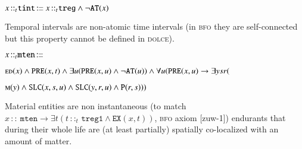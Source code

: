 \documentclass[ao]{iosart2x}
\newcommand{\dbDefLabel}{\textrm{d$_\texttt{db}$}}
\newcounter{cntdbdf}
\newcommand{\dbdf}[1]{\refstepcounter{cntdbdf}\begin{small}{\bf \dbDefLabel\thecntdbdf\label{#1}}\end{small}}
\newcommand{\pr}[1]{\mathtt{#1}}
\newcommand{\cn}[1]{\mathtt{#1}}
\newcommand\textequal{%
 \rule[.08ex]{5pt}{0.35pt}\llap{\rule[.78ex]{5pt}{0.35pt}}}
\newcommand{\sdef}{{\hspace{1.5pt}:\hspace{-2.5pt}\textequal\hspace{3pt}}}
\newcommand{\dolce}{{\textsc{dolce}}}
\newcommand{\bfo}{{\textsc{bfo}}}
\newcommand {\Mdcat} {\textsc{m}}
\newcommand {\ASdcat} {\textsc{as}}
\newcommand {\EDdcat} {\textsc{ed}}
\newcommand {\Pd} {\ensuremath{\pr{P}}}
\newcommand {\ATd} {\ensuremath{\pr{AT}}}
\newcommand {\PREd} {\ensuremath{\pr{PRE}}}
\newcommand {\SDd} {\ensuremath{\pr{SD}}}
\newcommand {\SLCd} {\ensuremath{\pr{SLC}}}
\newcommand{\mtenbcat}{\cn{mten}}
\newcommand{\tregbcat}{\cn{treg}}
\newcommand{\tintbcat}{\cn{tint}}
\newcommand{\onetregbcat}{\cn{treg1}}
\newcommand{\bfoexist}{\pr{EX}}
\newcommand{\bfoiof}[1]{{\,::_{#1\:\!}}}
\begin{document}
\item[\dbdf{d2b_tint}] $x \bfoiof{t} \tintbcat \sdef x \bfoiof{t} \tregbcat \land \neg\ATd(x)$

\vspace{1pt}
Temporal intervals are non-atomic time intervals (in {\bfo} they are self-connected but this property cannot be defined in {\dolce}).

%

\item[\dbdf{d2b_mten}] $x \bfoiof{t} \mtenbcat \sdef \ $\parbox[t]{\textwidth}{$\EDdcat(x) \land 
\PREd(x,t) \land \exists u(\PREd(x,u) \land \neg \ATd(u)) \land \\
\forall u(\PREd(x,u) \to \exists ysr($\parbox[t]{\textwidth}{$\Mdcat(y) \land \SLCd(x,s,u) \land \SLCd(y,r,u) \land \Pd(r,s)))$}}

\vspace{1pt}
Material entities are non instantaneous (to match $x \bfoiof{} \mtenbcat \to \exists t(t \bfoiof{t} \onetregbcat \land \bfoexist(x,t))$, {\bfo} axiom [zuw-1]) endurants that during their whole life are (at least partially) spatially co-localized with an amount of matter.
\end{document}

